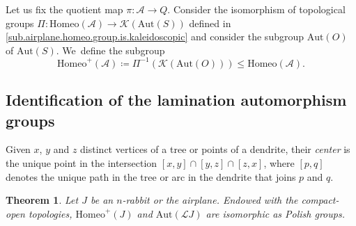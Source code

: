 \documentclass[JEP,XML,SOM,Unicode,NoFloatCountersInSection,published]{cedram}
\theoremstyle{plain}
\newtheorem{theorem}{Theorem}[section]
\theoremstyle{definition}
\theoremstyle{remark}
\newcommand{\Aut}{\mathrm{Aut}}
\newcommand{\Homeo}{\mathrm{Homeo}}
\newcommand{\A}{\mathcal{A}}
\newcommand{\K}{\mathcal{K}}
\begin{document}
Let us fix the quotient map $\pi \colon \A \to Q$.
Consider the isomorphism of topological groups $\Pi \colon \Homeo(\A) \to \K(\Aut(S))$ defined in \cref{sub.airplane.homeo.group.is.kaleidoscopic} and consider the subgroup $\Aut(O)$ of $\Aut(S)$. We~define the subgroup
\[
 \Homeo^+(\A) \coloneqq \Pi^{-1} (\K(\Aut(O))) \leq \Homeo(\A). 
\]

\subsection{Identification of the lamination automorphism groups}

Given $x$, $y$ and $z$ distinct vertices of a tree or points of a dendrite, their \emph{center} is the unique point in the intersection $[x,y] \cap [y,z] \cap [z,x]$, where $[p,q]$ denotes the unique path in the tree or arc in the dendrite that joins $p$ and $q$.

\begin{theorem}
\label{thm.auto.laminations}
Let $J$ be an $n$-rabbit or the airplane.
Endowed with the compact-open topologies, $\Homeo^+(J)$ and $\Aut(\mathcal{L}J)$ are isomorphic as Polish groups.
\end{theorem}
\end{document}
